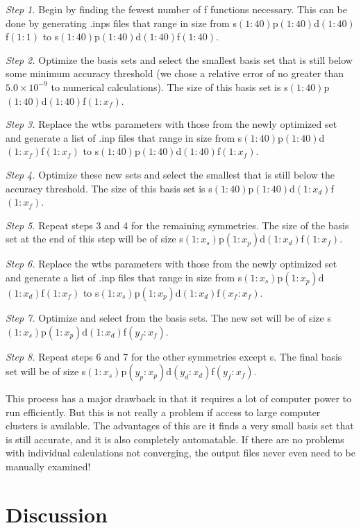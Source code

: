 \documentclass[12pt]{report}
\begin{document}
\textit{Step 1.} Begin by finding the fewest number of f functions necessary. This can be done by generating .inps files that range in size from s$(1:40)$p$(1:40)$d$(1:40)$f$(1:1)$ to s$(1:40)$p$(1:40)$d$(1:40)$f$(1:40)$.

\textit{Step 2.} Optimize the basis sets and select the smallest basis set that is still below some minimum accuracy threshold (we chose a relative error of no greater than $5.0\times10^{-9}$ to numerical calculations). The size of this basis set is s$(1:40)$p$(1:40)$d$(1:40)$f$(1:x_{f})$.

\textit{Step 3.} Replace the wtbs parameters with those from the newly optimized set and generate a list of .inp files that range in size from s$(1:40)$p$(1:40)$d$(1:x_{f})$f$(1:x_{f})$ to s$(1:40)$p$(1:40)$d$(1:40)$f$(1:x_{f})$.

\textit{Step 4.} Optimize these new sets and select the smallest that is still below the accuracy threshold. The size of this basis set is s$(1:40)$p$(1:40)$d$(1:x_{d})$f$(1:x_{f})$.

\textit{Step 5.} Repeat steps 3 and 4 for the remaining symmetries. The size of the basis set at the end of this step will be of size s$(1:x_{s})$p$(1:x_{p})$d$(1:x_{d})$f$(1:x_{f})$.

\textit{Step 6.} Replace the wtbs parameters with those from the newly optimized set and generate a list of .inp files that range in size from s$(1:x_{s})$p$(1:x_{p})$d$(1:x_{d})$f$(1:x_{f})$ to s$(1:x_{s})$p$(1:x_{p})$d$(1:x_{d})$f$(x_{f}:x_{f})$.

\textit{Step 7.} Optimize and select from the basis sets. The new set will be of size s$(1:x_{s})$p$(1:x_{p})$d$(1:x_{d})$f$(y_{f}:x_{f})$.

\textit{Step 8.} Repeat steps 6 and 7 for the other symmetries except s. The final basis set will be of size s$(1:x_{s})$p$(y_{p}:x_{p})$d$(y_{d}:x_{d})$f$(y_{f}:x_{f})$.

This process has a major drawback in that it requires a lot of computer power to run efficiently. But this is not really a problem if access to large computer clusters is available. The advantages of this are it finds a very small basis set that is still accurate, and it is also completely automatable. If there are no problems with individual calculations not converging, the output files never even need to be manually examined!

\section{Discussion}
\end{document}

